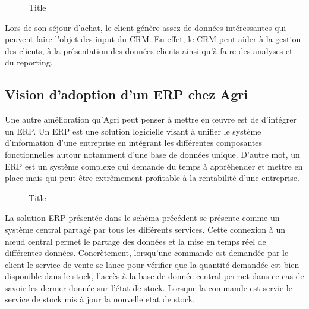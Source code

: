 \documentclass[a4paper]{report}
\begin{document}
\begin{doublespace}
\begin{figure}[H] 
	\begin{center}
		\caption{Title}
	\end{center}
\end{figure}

Lors de son séjour d'achat, le client génère assez de données intéressantes qui peuvent faire l'objet des input du CRM. En effet, le CRM peut aider à la gestion des clients, à la présentation des données clients ainsi qu'à faire des analyses et du reporting.

\subsection{Vision d'adoption d'un ERP chez Agri}

Une autre amélioration qu'Agri peut penser à mettre en œuvre est de
d'intégrer un ERP. Un ERP est une solution logicielle visant à unifier
le système d'information d'une entreprise en intégrant les différentes
composantes fonctionnelles autour notamment d'une base de données
unique. D'autre mot, un ERP est un système complexe qui demande du temps
à appréhender et mettre en place mais qui peut être extrêmement
profitable à la rentabilité d'une entreprise.

\begin{figure}[H] 
	\begin{center}
		\caption{Title}
	\end{center}
\end{figure}

La solution ERP présentée dans le schéma précédent se présente comme un système central partagé par tous les différents services. Cette connexion à un nœud central permet le partage des données et la mise en temps réel de différentes données.
Concrètement, lorsqu'une commande est demandée par le client le service de vente se lance pour vérifier que la quantité demandée est bien disponible dans le stock, l'accès à la base de donnée central permet dans ce cas de savoir les dernier donnée sur l'état de stock. Lorsque la commande est servie le service de stock mis à jour la nouvelle etat de stock.


\end{doublespace}
\end{document}
